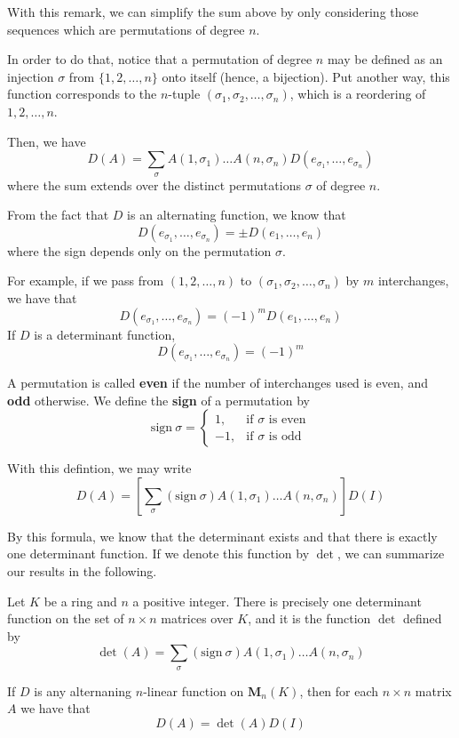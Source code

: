 With this remark, we can simplify the sum above by only considering those sequences which are permutations of degree $n$.

In order to do that, notice that a permutation of degree $n$ may be defined as an injection $\sigma$ from $\{ 1, 2, \ldots, n \}$ onto itself (hence, a bijection). Put another way, this function corresponds to the $n$-tuple $(\sigma_1, \sigma_2, \ldots, \sigma_n)$, which is a reordering of $1, 2, \ldots, n$.

Then, we have
\[
	D(A) = \sum_\sigma A(1, \sigma_1) \ldots A(n, \sigma_n) D(e_{\sigma_1}, \ldots, e_{\sigma_n})
\]
where the sum extends over the distinct permutations $\sigma$ of degree $n$.

From the fact that $D$ is an alternating function, we know that
\[
	D(e_{\sigma_1}, \ldots, e_{\sigma_n}) = \pm D(e_1, \ldots, e_n)
\]
where the sign depends only on the permutation $\sigma$.

For example, if we pass from $(1, 2, \ldots, n)$ to $(\sigma_1, \sigma_2, \ldots, \sigma_n)$ by $m$ interchanges, we have that
\[
	D(e_{\sigma_1}, \ldots, e_{\sigma_n}) = (-1)^m D(e_1, \ldots, e_n)
\]
If $D$ is a determinant function,
\[
	D(e_{\sigma_1}, \ldots, e_{\sigma_n}) = (-1)^m
\]


A permutation is called \textbf{even} if the number of interchanges used is even, and \textbf{odd} otherwise. We define the \textbf{sign} of a permutation by
\begin{equation*}
	\text{sign} ~\sigma = \begin{cases}
		1, & \text{if $\sigma$ is even} \\
		-1, & \text{if $\sigma$ is odd}
	\end{cases}
\end{equation*}

With this defintion, we may write
\[
	D(A) = \left[ \sum_\sigma (\text{sign} ~\sigma) A(1, \sigma_1) \ldots A(n, \sigma_n) \right] D(I)
\]

By this formula, we know that the determinant exists and that there is exactly one determinant function. If we denote this function by $\det$, we can summarize our results in the following.

\begin{theorem}\label{thm:det_A_I}
	Let $K$ be a ring and $n$ a positive integer. There is precisely one determinant function on the set of $n \times n$ matrices over $K$, and it is the function $\det$ defined by
	\[
		\det(A) = \sum_\sigma (\text{sign} ~\sigma) A(1, \sigma_1) \ldots A(n, \sigma_n)
	\]
	
	If $D$ is any alternaning $n$-linear function on $\textbf{M}_n(K)$, then for each $n \times n$ matrix $A$ we have that
	\[
		D(A) = \det(A) D(I)
	\]
\end{theorem}


